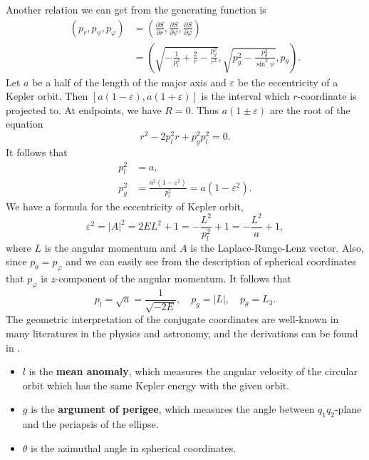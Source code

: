 \documentclass{amsart}
\newcommand{\vp}{\varphi}
\newcommand{\pp}{\partial}
\newcommand{\eps}{\varepsilon}
\begin{document}
	Another relation we can get from the generating function is
	$$
	\begin{aligned}
		(p_r,p_\psi,p_\vp)&=\left(\frac{\pp S}{\pp r},\frac{\pp S}{\pp \psi},\frac{\pp S}{\pp \vp}\right)\\
		&=\left(\sqrt{-\frac{1}{p_l^2}+\frac{2}{r}-\frac{p_g^2}{r^2}},\sqrt{p_g^2-\frac{p_\theta^2}{\sin^2\psi}},p_\theta\right).
	\end{aligned}
	$$
	Let $a$ be a half of the length of the major axis and $\eps$ be the eccentricity of a Kepler orbit.
	Then $[a(1-\eps), a(1+\eps)]$ is the interval which $r$-coordinate is projected to.
	At endpoints, we have $R=0$.
	Thus $a(1\pm \eps)$ are the root of the equation
	$$
	r^2 - 2p_l^2 r + p_g^2 p_l^2 =0.
	$$
	It follows that
	$$
	\begin{aligned}
		p_l^2 & = a,\\
		p_g^2 & = \frac{a^2(1-\eps^2)}{p_l^2} = a(1-\eps^2).
	\end{aligned}
	$$
	We have a formula for the eccentricity of Kepler orbit,
	$$
	\eps^2 = |A|^2 = 2EL^2 + 1 = -\frac{L^2}{p_l^2} + 1 = -\frac{L^2}{a} +1,
	$$
	where $L$ is the angular momentum and $A$ is the Laplace-Runge-Lenz vector.
	Also, since $p_\theta=p_\vp$ and we can easily see from the description of spherical coordinates that $p_\vp$ is $z$-component of the angular momentum.
	It follows that
	$$
	p_l=\sqrt{a}=\frac{1}{\sqrt{-2E}},\quad		p_g= |L|,\quad p_\theta = L_3.
	$$
	The geometric interpretation of the conjugate coordinates are well-known in many literatures in the physics and astronomy, and the derivations can be found in \cite{Chenciner_89}.
	\begin{itemize}
		\item $l$ is the \textbf{mean anomaly}, which measures the angular velocity of the circular orbit which has the same Kepler energy with the given orbit.
		\item $g$ is the \textbf{argument of perigee}, which measures the angle between $q_1q_2$-plane and the periapsis of the ellipse.
		\item $\theta$ is the azimuthal angle in spherical coordinates.
	\end{itemize}

	


\end{document}
